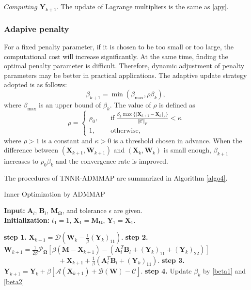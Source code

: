 \documentclass{article}
\begin{document}
{$\textit{Computing}$  $\mathbf Y_{k+1}$. The update of Lagrange multipliers is the same as \eqref{apy}.

\subsubsection{Adapive penalty}
For a fixed penalty parameter, if it is chosen to be too small or too large, the computational cost will increase significantly. At the same time, finding the optimal penalty parameter is difficult. Therefore, dynamic adjustment of penalty parameters may be better in practical applications. The adaptive update strategy adopted is as follows:
\begin{equation}
    \beta_{k+1} = \min(\beta_{\max}, \rho \beta_k),\label{beta1}
\end{equation}
where $\beta_{\max}$ is an upper bound of $\beta_k$. The value of $\rho$ is defined as
\begin{equation}
    \rho = \left\{
        \begin{aligned}
            \rho_0, \quad & \text{if} \; \frac{\beta_k \max\{ \Vert\mathbf X_{k+1} - \mathbf X_k \Vert_F \}}{ \Vert \mathcal{C} \Vert_F} < \kappa \\
            1, \quad & \text{otherwise},
        \end{aligned}
    \right.
    \label{beta2}
\end{equation}
where $\rho > 1$ is a constant and $\kappa >0 $ is a threshold chosen in advance. When the difference between $(\mathbf X_{k+1}, \mathbf W_{k+1})$ and $(\mathbf X_{k}, \mathbf W_{k})$ is small enough, $\beta_{k+1}$ increases to $\rho_0\beta_k$ and the convergence rate is improved.

The procedures of TNNR-ADMMAP are summarized in Algorithm \ref{algo4}.

\begin{algorithm}[t]
    \caption{Inner Optimization by ADMMAP}
    \label{algo4}
    \textbf{Input:} $\mathbf A_l$, $\mathbf B_l$, $\mathbf M_{\mathbf\Omega}$, and tolerance $\epsilon$ are given.\\
    \textbf{Initialization:} $t_1 = 1$, $\mathbf X_1 = \mathbf M_{\mathbf\Omega}$, $\mathbf Y_1=\mathbf X_1$.
    \begin{algorithmic}
        \Repeat 
        \State \textbf{step 1.} $\mathbf X_{k+1} = \mathcal{D}\left(\mathbf W_k - \frac{1}{\beta}(\mathbf Y_k)_{11}\right)$.
        \State \textbf{step 2.} $\mathbf W_{k+1} = \frac{1}{2\beta} \mathcal{P}_{\mathbf\Omega} [\beta(\mathbf M-\mathbf X_{k+1}) - (\mathbf A_l^T\mathbf B_l + (\mathbf Y_k)_{11}+ (\mathbf Y_k)_{22})]$ \\
        $ \quad\quad\quad\quad\quad\quad\quad\quad+ \mathbf X_{k+1} +  \frac{1}{\beta}(\mathbf A_l^T\mathbf B_l + (\mathbf Y_k)_{11})$.
        \State \textbf{step 3.} $\mathbf Y_{k+1} = \mathbf Y_{k}+\beta[\mathcal{A}(\mathbf X_{k+1})+\mathcal{B}(\mathbf W)-\mathcal{C}]$.
        \State \textbf{step 4.} Update $\beta_k$ by \eqref{beta1} and \eqref{beta2}
    \end{algorithmic}
\end{algorithm}



}
\end{document}
